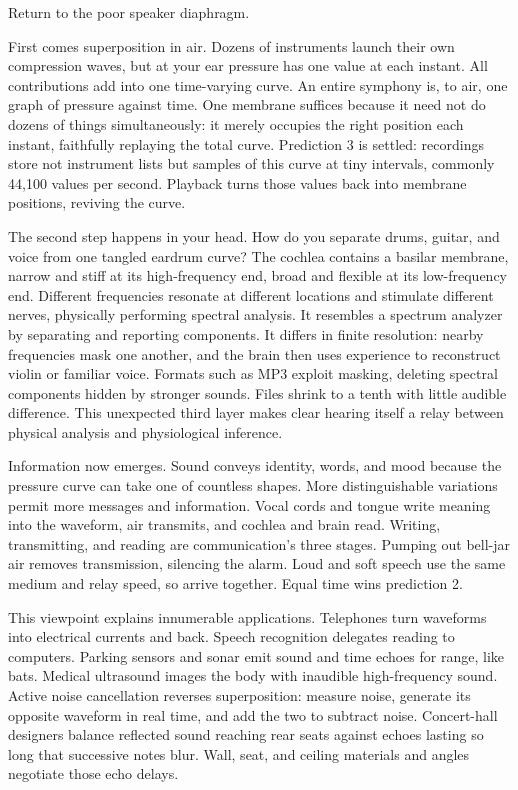 
\begin{mainline}
Return to the poor speaker diaphragm.

First comes superposition in air. Dozens of instruments launch their own compression waves, but at your ear pressure has one value at each instant. All contributions add into one time-varying curve. An entire symphony is, to air, one graph of pressure against time. One membrane suffices because it need not do dozens of things simultaneously: it merely occupies the right position each instant, faithfully replaying the total curve. Prediction 3 is settled: recordings store not instrument lists but samples of this curve at tiny intervals, commonly 44,100 values per second. Playback turns those values back into membrane positions, reviving the curve.

The second step happens in your head. How do you separate drums, guitar, and voice from one tangled eardrum curve? The cochlea contains a basilar membrane, narrow and stiff at its high-frequency end, broad and flexible at its low-frequency end. Different frequencies resonate at different locations and stimulate different nerves, physically performing spectral analysis. It resembles a spectrum analyzer by separating and reporting components. It differs in finite resolution: nearby frequencies mask one another, and the brain then uses experience to reconstruct violin or familiar voice. Formats such as MP3 exploit masking, deleting spectral components hidden by stronger sounds. Files shrink to a tenth with little audible difference. This unexpected third layer makes clear hearing itself a relay between physical analysis and physiological inference.

Information now emerges. Sound conveys identity, words, and mood because the pressure curve can take one of countless shapes. More distinguishable variations permit more messages and information. Vocal cords and tongue write meaning into the waveform, air transmits, and cochlea and brain read. Writing, transmitting, and reading are communication's three stages. Pumping out bell-jar air removes transmission, silencing the alarm. Loud and soft speech use the same medium and relay speed, so arrive together. Equal time wins prediction 2.

This viewpoint explains innumerable applications. Telephones turn waveforms into electrical currents and back. Speech recognition delegates reading to computers. Parking sensors and sonar emit sound and time echoes for range, like bats. Medical ultrasound images the body with inaudible high-frequency sound. Active noise cancellation reverses superposition: measure noise, generate its opposite waveform in real time, and add the two to subtract noise. Concert-hall designers balance reflected sound reaching rear seats against echoes lasting so long that successive notes blur. Wall, seat, and ceiling materials and angles negotiate those echo delays.


\end{mainline}
